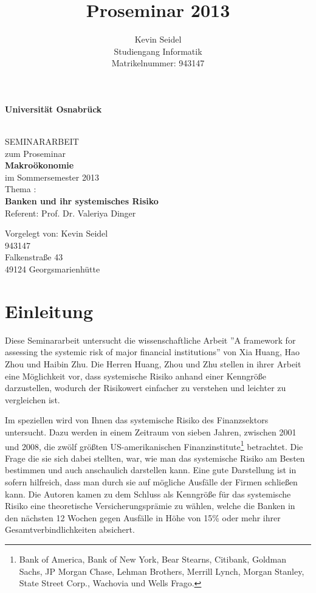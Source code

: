 \documentclass[a4paper,12pt]{scrartcl}
\title{Proseminar 2013}
\author{Kevin Seidel \\ Studiengang Informatik \\ Matrikelnummer: 943147}
\begin{document}
\begin{titlepage}
\begin{center}
\vspace*{1.5cm}
\begin{Large}
\textbf{Universität Osnabrück} \\[1cm]
\end{Large}

\noindent\hrulefill
\\[1.5cm]
SEMINARARBEIT \\[1cm]
zum Proseminar \\[1cm]
\textbf{Makroökonomie} \\[1cm]
im Sommersemester 2013 \\[1.5cm]
Thema : \\[1cm]
\textbf{Banken und ihr systemisches Risiko} \\[1cm]
Referent: Prof. Dr. Valeriya Dinger \\[2cm]

\end{center}
\begin{flushleft}
Vorgelegt von: \hfill Kevin Seidel \\
\hfill 943147 \\
\hfill Falkenstraße 43 \\
\hfill 49124 Georgsmarienhütte
\end{flushleft}

\end{titlepage}

\newpage

\setcounter{page}{2}
\tableofcontents



\newpage
{} 
\setcounter{page}{1} 
\section{Einleitung}
Diese Seminararbeit untersucht die wissenschaftliche Arbeit ''A framework for assessing the systemic risk of major financial institutions'' von  Xia Huang, Hao Zhou und Haibin Zhu. 
Die Herren Huang, Zhou und Zhu stellen in ihrer Arbeit eine Möglichkeit vor, dass systemische Risiko anhand einer Kenngröße darzustellen, wodurch der Risikowert einfacher zu verstehen und leichter zu vergleichen ist.

Im speziellen wird von Ihnen das systemische Risiko des Finanzsektors untersucht. Dazu werden in einem Zeitraum von sieben Jahren, zwischen 2001 und 2008, die zwölf größten US-amerikanischen Finanzinstitute\footnote{Bank of America, Bank of New York, Bear Stearns, Citibank, Goldman Sachs, JP Morgan Chase, Lehman Brothers, Merrill Lynch, Morgan Stanley, State Street Corp., Wachovia und Wells Frago.} betrachtet. 
Die Frage die sie sich dabei stellten, war, wie man das systemische Risiko am Besten bestimmen und auch anschaulich darstellen kann. Eine gute Darstellung ist in sofern hilfreich, dass man durch sie auf mögliche Ausfälle der Firmen schließen kann.
Die Autoren kamen zu dem Schluss als Kenngröße für das systemische Risiko eine theoretische Versicherungsprämie zu wählen, welche die Banken in den nächsten 12 Wochen gegen Ausfälle in Höhe von 15\% oder mehr ihrer Gesamtverbindlichkeiten absichert. 
\end{document}
